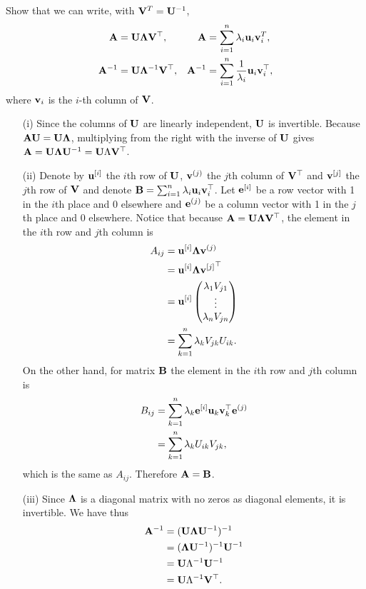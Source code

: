\begin{exenumerate}
\item Show that we can write, with $\mathbf{V}^T=\mathbf{U}^{-1}$,
  \begin{align}
    \mathbf{A} &= \mathbf{U} \mathbf{\Lambda} \mathbf{V}^\top,&     \mathbf{A} &= \sum_{i=1}^n \lambda_i \mathbf{u}_i\mathbf{v}_i^T,\\
    \mathbf{A}^{-1} &= \mathbf{U} \mathbf{\Lambda}^{-1} \mathbf{V}^\top, & \mathbf{A}^{-1} &= \sum_{i=1}^n \frac{1}{\lambda_i} \mathbf{u}_i\mathbf{v}_i^\top,
  \end{align}
  where $\mathbf{v}_i$ is the $i$-th column of $\mathbf{V}$.
  \begin{solution}
    \begin{enumerate}
    \item[(i)] Since the columns of $\mathbf{U}$ are linearly independent,
      $\mathbf{U}$ is invertible. Because $\mathbf{A}\mathbf{U} = \mathbf{U}\mathbf{\Lambda}$, multiplying from
      the right with the inverse of $\mathbf{U}$ gives $\mathbf{A} = \mathbf{U}\mathbf{\Lambda} \mathbf{U}^{-1} =
      \mathbf{U}\Lambda \mathbf{V}^\top$.
    \item[(ii)] Denote by $\mathbf{u}^{[i]}$ the $i$th row of $\mathbf{U}$,
      $\mathbf{v}^{(j)}$ the $j$th column of $\mathbf{V}^\top$ and $\mathbf{v}^{[j]}$
      the $j$th row of $\mathbf{V}$ and denote $\mathbf{B} = \sum_{i=1}^n
      \lambda_i\mathbf{u}_i\mathbf{v}_i^\top$. Let $\mathbf{e}^{[i]}$ be a row vector
      with 1 in the $i$th place and 0 elsewhere and $\mathbf{e}^{(j)}$ be a
      column vector with 1 in the $j$th place and 0
      elsewhere. Notice that because $\mathbf{A} = \mathbf{U}\mathbf{\Lambda} \mathbf{V}^\top$,
      the element in the $i$th row and $j$th column is
      \begin{align}
        A_{ij}  &= \mathbf{u}^{[i]}\mathbf{\Lambda} \mathbf{v}^{(j)} \\
                &= \mathbf{u}^{[i]}\mathbf{\Lambda} {\mathbf{v}^{[j]}}^\top \\
                &= \mathbf{u}^{[i]} \left( \begin{matrix} \lambda_1V_{j1} \\ \vdots \\ \lambda_nV_{jn} \end{matrix} \right) \\
                &= \sum_{k=1}^n \lambda_k V_{jk}U_{ik}.
      \end{align}
      On the other hand, for matrix $\mathbf{B}$ the element in the $i$th row and $j$th column is
      \begin{align}
        B_{ij}  &= \sum_{k=1}^n \lambda_k\mathbf{e}^{[i]}\mathbf{u}_k\mathbf{v}_k^\top \mathbf{e}^{(j)} \\
                &= \sum_{k=1}^n \lambda_kU_{ik}V_{jk},
      \end{align}
      which is the same as $A_{ij}$. Therefore $\mathbf{A} = \mathbf{B}$.
      
    \item[(iii)] Since $\mathbf{\Lambda}$ is a diagonal matrix with no zeros as diagonal
      elements, it is invertible. We have thus
      \begin{align}
        \mathbf{A}^{-1} &= (\mathbf{U}\mathbf{\Lambda}{\mathbf{U}^{-1}})^{-1} \\
                & = (\mathbf{\Lambda} \mathbf{U}^{-1})^{-1}\mathbf{U}^{-1} \\
                &= \mathbf{U} \Lambda^{-1} \mathbf{U}^{-1} \\
                &= \mathbf{U}\Lambda^{-1}\mathbf{V}^\top.
      \end{align}


\end{enumerate}
\end{solution}
\end{exenumerate}
